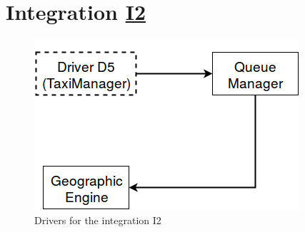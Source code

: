\section{Integration \hyperref[I2]{I2} \label{int_I2}}
\begin{figure}[H]
\centering
\includegraphics[scale = 0.5]{"../Analysis Documents/I2"}
\caption{Drivers for the integration I2}
\end{figure}